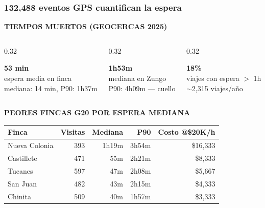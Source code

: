 \documentclass[aspectratio=169, 10pt]{beamer}
\newcommand{\tagline}[2]{{\scriptsize\color{#1}\textbf{\MakeUppercase{#2}}}}
\begin{document}
\begin{frame}
\frametitle{132,488 eventos GPS cuantifican la espera}
\tagline{rojo}{Tiempos Muertos (Geocercas 2025)}
\vspace{-2pt}

\begin{columns}[T]
\begin{column}{0.32\textwidth}
\colorbox{rojoclaro}{\parbox{\dimexpr\linewidth-8pt}{\centering\strut
{\large\textcolor{rojo}{\textbf{53 min}}}\\[1pt]
{\tiny espera media en finca}\\
{\tiny mediana: 14 min, P90: 1h37m}\strut}}
\end{column}
\begin{column}{0.32\textwidth}
\colorbox{rojoclaro}{\parbox{\dimexpr\linewidth-8pt}{\centering\strut
{\large\textcolor{rojo}{\textbf{1h53m}}}\\[1pt]
{\tiny mediana en Zungo}\\
{\tiny P90: 4h09m --- cuello}\strut}}
\end{column}
\begin{column}{0.32\textwidth}
\colorbox{rojoclaro}{\parbox{\dimexpr\linewidth-8pt}{\centering\strut
{\large\textcolor{rojo}{\textbf{18\%}}}\\[1pt]
{\tiny viajes con espera $>$ 1h}\\
{\tiny $\sim$2,315 viajes/a\~no}\strut}}
\end{column}
\end{columns}

\vspace{6pt}
{\scriptsize\color{gris}\textbf{PEORES FINCAS G20 POR ESPERA MEDIANA}}
\vspace{2pt}

\begin{center}
\scriptsize
\renewcommand{\arraystretch}{1.05}
\begin{tabular}{l r r r r}
    \toprule
    \textbf{Finca} & \textbf{Visitas} & \textbf{Mediana} & \textbf{P90} & \textbf{Costo @\$20K/h} \\
    \midrule
    Nueva Colonia & 393 & \textcolor{rojo}{1h19m} & 3h54m & \textcolor{rojo}{\$16,333} \\
    Castillete    & 471 & \textcolor{rojo}{55m}   & 2h21m & \textcolor{rojo}{\$8,333} \\
    Tucanes       & 597 & \textcolor{amarillo}{47m}  & 2h08m & \textcolor{amarillo}{\$5,667} \\
    San Juan      & 482 & \textcolor{amarillo}{43m}  & 2h15m & \textcolor{amarillo}{\$4,333} \\
    Chinita       & 509 & \textcolor{amarillo}{40m}  & 1h57m & \textcolor{amarillo}{\$3,333} \\
    \bottomrule
\end{tabular}
\end{center}


\end{frame}
\end{document}
